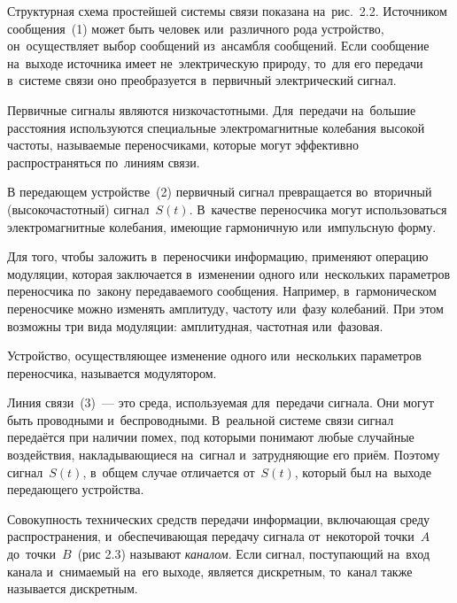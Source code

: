 \documentclass[
	a4paper,
	oneside,
	BCOR = 10mm,
	DIV = 12,
	12pt,
	headings = normal,
]{scrartcl}
\begin{document}
			Структурная схема простейшей системы связи показана на~рис.~2.2. Источником сообщения~(1) может быть человек или~различного рода устройство, он~осуществляет выбор сообщений из~ансамбля сообщений. Если сообщение на~выходе источника имеет не~электрическую природу, то~для его передачи в~системе связи оно преобразуется в~первичный электрический сигнал.

			Первичные сигналы являются низкочастотными. Для~передачи на~большие расстояния используются специальные электромагнитные колебания высокой частоты, называемые переносчиками, которые могут эффективно распространяться по~линиям связи. 

			В передающем устройстве~(2) первичный сигнал превращается во~вторичный (высокочастотный) сигнал~$S(t)$. В~качестве переносчика могут использоваться электромагнитные колебания, имеющие гармоничную или~импульсную форму.

			Для того, чтобы заложить в~переносчики информацию, применяют операцию модуляции, которая заключается в~изменении одного или~нескольких параметров переносчика по~закону передаваемого сообщения. Например, в~гармоническом переносчике можно изменять амплитуду, частоту или~фазу колебаний. При этом возможны три вида модуляции: амплитудная, частотная или~фазовая.

			Устройство, осуществляющее изменение одного или~нескольких параметров переносчика, называется модулятором.

			Линия связи~(3)~— это среда, используемая для~передачи сигнала. Они могут быть проводными и~беспроводными. В~реальной системе связи сигнал передаётся при наличии помех, под которыми понимают любые случайные воздействия, накладывающиеся на~сигнал и~затрудняющие его приём. Поэтому сигнал~$S(t)$, в~общем случае отличается от~$S(t)$, который был на~выходе передающего устройства. 

			Совокупность технических средств передачи информации, включающая среду распространения, и~обеспечивающая передачу сигнала от~некоторой точки~$A$ до~точки~$B$~(рис 2.3) называют \emph{каналом}. Если сигнал, поступающий на~вход канала и~снимаемый на~его выходе, является дискретным, то~канал также называется дискретным.
\end{document}
